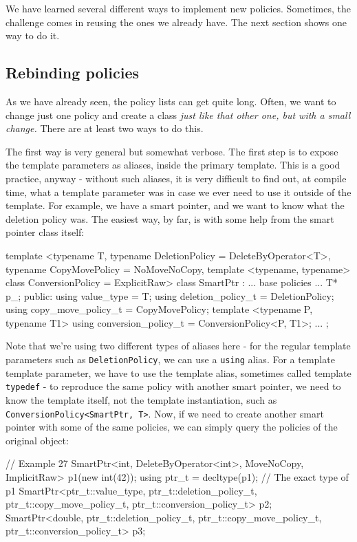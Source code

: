 We have learned several different ways to implement new policies. Sometimes, the challenge comes in reusing the ones we already have. The next section shows one way to do it.

\subsection{Rebinding policies}

As we have already seen, the policy lists can get quite long. Often, we want to change just one policy and create a class \emph{just like that other one, but with a small change.} There are at least two ways to do this.

The first way is very general but somewhat verbose. The first step is to expose the template parameters as aliases, inside the primary template. This is a good practice, anyway - without such aliases, it is very difficult to find out, at compile time, what a template parameter was in case we ever need to use it outside of the template. For example, we have a smart pointer, and we want to know what the deletion policy was. The easiest way, by far, is with some help from the smart pointer class itself:

\begin{code}
template <typename T,
          typename DeletionPolicy = DeleteByOperator<T>,
          typename CopyMovePolicy = NoMoveNoCopy,
          template <typename, typename>
            class ConversionPolicy = ExplicitRaw>
class SmartPtr : ... base policies ... {
  T* p_;
  public:
  using value_type = T;
  using deletion_policy_t = DeletionPolicy;
  using copy_move_policy_t = CopyMovePolicy;
  template <typename P, typename T1>
  using conversion_policy_t = ConversionPolicy<P, T1>;
  ...
};
\end{code}

Note that we're using two different types of aliases here - for the regular template parameters such as \texttt{DeletionPolicy}, we can use a \texttt{using} alias. For a template template parameter, we have to use the template alias, sometimes called template \texttt{typedef} - to reproduce the same policy with another smart pointer, we need to know the template itself, not the template instantiation, such as \texttt{ConversionPolicy\textless{}SmartPtr,\ T\textgreater{}}. Now, if we need to create another smart pointer with some of the same policies, we can simply query the policies of the original object:

\begin{code}
// Example 27
SmartPtr<int,
  DeleteByOperator<int>, MoveNoCopy, ImplicitRaw>
  p1(new int(42));
using ptr_t = decltype(p1); // The exact type of p1
SmartPtr<ptr_t::value_type,
  ptr_t::deletion_policy_t, ptr_t::copy_move_policy_t,
  ptr_t::conversion_policy_t> p2;
SmartPtr<double,
  ptr_t::deletion_policy_t, ptr_t::copy_move_policy_t,
  ptr_t::conversion_policy_t> p3;
\end{code}

